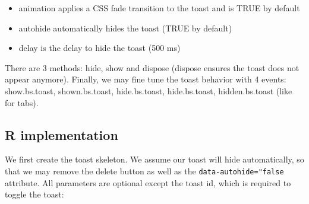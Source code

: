 \documentclass[
]{book}
\providecommand{\tightlist}{%
  \setlength{\itemsep}{0pt}\setlength{\parskip}{0pt}}
\begin{document}
\begin{itemize}
\tightlist
\item
  animation applies a CSS fade transition to the toast and is TRUE by default
\item
  autohide automatically hides the toast (TRUE by default)
\item
  delay is the delay to hide the toast (500 ms)
\end{itemize}

There are 3 methods: hide, show and dispose (dispose ensures the toast does not appear anymore). Finally, we may fine tune the toast behavior with 4 events: show.bs.toast, shown.bs.toast, hide.bs.toast, hide.bs.toast, hidden.bs.toast (like for tabs).

\hypertarget{r-implementation}{%
\subsection{R implementation}\label{r-implementation}}

We first create the toast skeleton. We assume our toast will hide automatically, so that we may remove the delete button as well as the \texttt{data-autohide="false} attribute. All parameters are optional except the toast id, which is required to toggle the toast:
\end{document}
